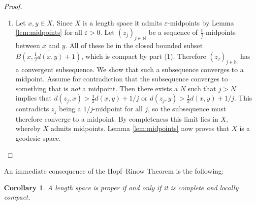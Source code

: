 \documentclass[11pt, a4paper, oneside]{memoir}
\theoremstyle{plain}\newtheorem{theorem}[subsection]{Theorem}
\newtheorem{corollary}[subsection]{Corollary}
\theoremstyle{definition}
\newcommand{\N}{\mathbb{N}}
\begin{document}
\begin{proof}
\begin{enumerate}
Consider now the subsequence \((y_{j_k})_{k\in\N}\) of \((y_j)_{j\in\N}\).
As \((\varepsilon_i)\to 0\) we can choose an \(i\) such that \(\varepsilon_i<\varepsilon\).
Now all the \((x_{j_k}^p)_{k\in \N}\) are convergent for all \(p\), and therefore Cauchy, so by definition \(d(x_{j_k}^i,x_{j_l}^i)\leq \varepsilon\) for sufficiently large \(k,l\).
By the triangle inequality:
\[d(y_{j_k},y_{j_l})\leq d(y_{j_k},x_{j_k}^i)+d(x_{j_k}^i,x_{j_l}^i)+d(x_{j_l}^i,y_{j_l})\leq \varepsilon_i+\varepsilon+\varepsilon_i\leq 3\varepsilon.\]
As \(X\) is assumed complete, the subsequence \((y_{j_k})\) of \((y_j)\) converges, whereby \(\overline{B(x,\rho)}\) is sequentially compact and therefore compact as was to be shown.

Assuming that \(\rho<\infty\) we then have that \(\overline{B(x,\rho)}\) is compact.
But this implies as shown before that there exists a \(\delta>0\) such that \(\overline{B(x,\rho+\delta)}\) is compact which contradicts \(\rho\) being an upper bound.
Therefore \(\rho=\infty\) and we are done with the first part of the theorem.


\item Let \(x,y\in X\).
Since \(X\) is a length space it admits \(\varepsilon\)-midpoints by Lemma \ref{lem:midpoints} for all \(\varepsilon>0\).
Let \((z_j)_{j\in\N}\) be a sequence of \(\frac{1}{j}\)-midpoints between \(x\) and \(y\).
All of these lie in the closed bounded subset \(\overline{B(x,\frac{1}{2}d(x,y)+1)}\), which is compact by part (1). Therefore \((z_j)_{j\in\N}\) has a convergent subsequence.
We show that such a subsequence converges to a midpoint.
Assume for contradiction that the subsequence converges to something that is \emph{not} a midpoint. 
Then there exists a \(N\) such that \(j>N\) implies that \(d(z_j,x)> \frac{1}{2}d(x,y)+1/j\) or \(d(z_j,y)>\frac{1}{2}d(x,y)+1/j\). 
This contradicts \(z_j\) being a \(1/j\)-midpoint for all \(j\), so the subsequence must therefore converge to a midpoint.
By completeness this limit lies in \(X\), whereby \(X\) admits midpoints.
Lemma \ref{lem:midpoints} now proves that \(X\) is a geodesic space.
\end{enumerate}
\end{proof}

An immediate consequence of the Hopf--Rinow Theorem is the following: 
\begin{corollary}
A length space is proper if and only if it is complete and locally compact.
\end{corollary}
\end{document}
